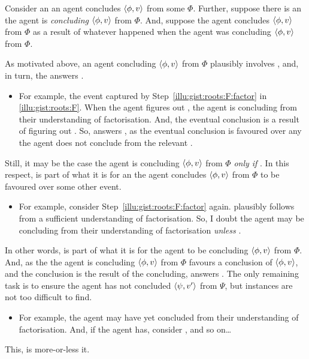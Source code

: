 \begin{note}
  Consider an  an agent concludes \(\langle\phi, v\rangle\) from some \pool{} \(\Phi\).
  Further, suppose there is an  the agent is \emph{concluding} \(\langle\phi, v\rangle\) from \(\Phi\).
  And, suppose the agent concludes \(\langle\phi, v\rangle\) from \(\Phi\) as a result of whatever happened when the agent was concluding \(\langle\phi, v\rangle\) from \(\Phi\).

  As motivated above, an agent concluding \(\langle\phi, v\rangle\) from \(\Phi\) plausibly involves , and, in turn, the \fingfr{} answers \qWhy{}.
  \begin{itemize}
  \item
    For example, the event captured by Step~\ref{illu:gist:roots:F:factor} in \autoref{illu:gist:roots:F}.
    When the agent figures out , the agent is concluding  from their understanding of factorisation.
    And, the eventual conclusion is a result of figuring out .
    So,  answers \qWhy{}, as the \agents{} eventual conclusion is favoured over any  the agent does not conclude  from the relevant \pool{}.
  \end{itemize}
  Still, it may be the case the agent is concluding \(\langle\phi, v\rangle\) from \(\Phi\) \emph{only if} .
  In this respect,  is part of what it is for an  the agent concludes \(\langle\phi, v\rangle\) from \(\Phi\) to be favoured over some other event.
  \begin{itemize}
  \item
    For example, consider Step~\ref{illu:gist:roots:F:factor} again.
     plausibly follows from a sufficient understanding of factorisation.
    So, I doubt the agent may be concluding  from their understanding of factorisation \emph{unless} .
  \end{itemize}
  In other words,  is part of what it is for the agent to be concluding \(\langle\phi, v\rangle\) from \(\Phi\).
  And, as the  the agent is concluding \(\langle\phi, v\rangle\) from \(\Phi\) favours a conclusion of \(\langle\phi, v\rangle\), and the conclusion is the result of the concluding,  answers \qWhy{}.
  The only remaining task is to ensure the agent has not concluded \(\langle\psi, v'\rangle\) from \(\Psi\), but instances are not too difficult to find.
  \begin{itemize}
  \item
    For example, the agent may have yet concluded  from their understanding of factorisation.
    And, if the agent has, consider , and so on\dots
  \end{itemize}
  This, is more-or-less it.


\end{note}
